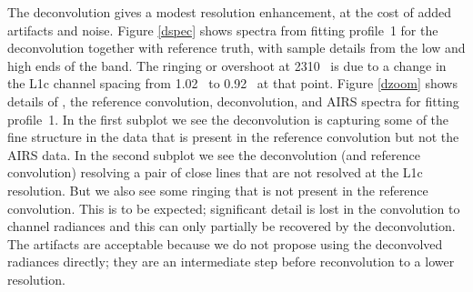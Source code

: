 \documentclass[journal]{IEEEtran}
\begin{document}
The {\airs} deconvolution gives a modest resolution enhancement, at
the cost of added artifacts and noise.  Figure \ref{dspec} shows
spectra from fitting profile~1 \cite{sarta1,sarta2} for the {\airs}
deconvolution together with reference truth, with sample details
from the low and high ends of the band.  The ringing or overshoot at
2310~{\wn} is due to a change in the L1c channel spacing from
1.02~{\wn} to 0.92~{\wn} at that point.
Figure \ref{dzoom} shows details of {\kcarta}, the reference
convolution, deconvolution, and AIRS spectra for fitting profile~1.
In the first subplot we see the deconvolution is capturing some of
the fine structure in the {\kcarta} data that is present in the
reference convolution but not the AIRS data.  In the second subplot
we see the deconvolution (and reference convolution) resolving a
pair of close lines that are not resolved at the {\airs} L1c
resolution.  But we also see some ringing that is not present in the
reference convolution.  This is to be expected; significant detail
is lost in the convolution to {\airs} channel radiances and this can
only partially be recovered by the deconvolution.  The artifacts are
acceptable because we do not propose using the deconvolved radiances
directly; they are an intermediate step before reconvolution to a
lower resolution.


\end{document}
